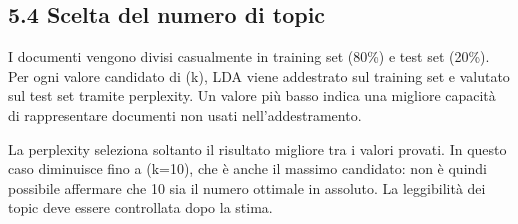 \documentclass[
]{article}
\begin{document}
\subsection{5.4 Scelta del numero di
topic}\label{scelta-del-numero-di-topic}

I documenti vengono divisi casualmente in training set (80\%) e test set
(20\%). Per ogni valore candidato di (k), LDA viene addestrato sul
training set e valutato sul test set tramite perplexity. Un valore più
basso indica una migliore capacità di rappresentare documenti non usati
nell'addestramento.

La perplexity seleziona soltanto il risultato migliore tra i valori
provati. In questo caso diminuisce fino a (k=10), che è anche il massimo
candidato: non è quindi possibile affermare che 10 sia il numero
ottimale in assoluto. La leggibilità dei topic deve essere controllata
dopo la stima.
\end{document}
